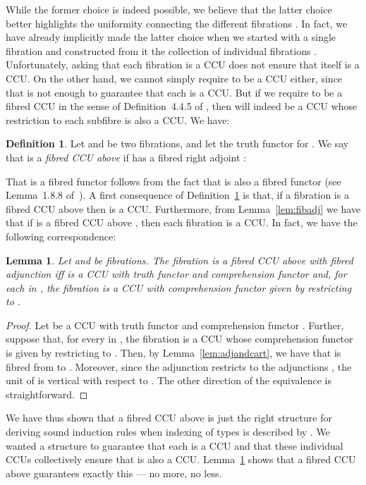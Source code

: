 \documentclass{LMCS}
\theoremstyle{plain}
\newtheorem{lemma}[theorem]{Lemma}
\theoremstyle{remark}
\theoremstyle{definition}
\newtheorem{definition}[theorem]{Definition}
\begin{document}
While the former choice is indeed possible, we believe that the latter
choice better highlights the uniformity connecting the different
fibrations . In fact, we have already implicitly made the latter
choice when we started with a single fibration  and constructed
from it the collection of individual fibrations . Unfortunately,
asking that each fibration  is a CCU does not ensure that 
itself is a CCU.
On the other hand, we cannot simply require  to be a CCU either,
since that is not enough to guarantee that each  is a CCU. But if
we require  to be a fibred CCU in the sense of Definition~4.4.5 of
\cite{jac91}, then  will indeed be a CCU whose restriction to each
subfibre  is also a CCU. We have:

\begin{definition}\label{def:ccua}
  Let  and  be two fibrations, and let
   the truth functor for . We say that  is a
  \emph{fibred CCU above } if  has a fibred right adjoint
  : 
\end{definition}
\noindent
That  is a fibred functor follows from the fact that  is also a fibred functor (see Lemma~1.8.8
of~\cite{jac99}). A first consequence of Definition~\ref{def:ccua} is
that, if a fibration  is a fibred CCU above  then  is
a CCU. Furthermore, from Lemma~\ref{lem:fibadj} we have that if 
is a fibred CCU above , then each fibration  is a CCU. In
fact, we have the following correspondence: 

\begin{lemma}\label{lem:ccuafibadj}
  Let  and  be fibrations. The fibration  is
  a fibred CCU above  with fibred adjunction  iff
   is a CCU with truth functor  and comprehension
  functor  and, for each  in , the fibration
   is a CCU with comprehension functor
   given by restricting  to .
\end{lemma}

\begin{proof}
  Let  be a CCU with truth functor  and comprehension
  functor .  Further, suppose that, for every  in
  , the fibration  is a CCU whose comprehension
  functor  is given by restricting  to
  .  Then, by Lemma~\ref{lem:adjandcart}, we have that 
  is fibred from  to . Moreover, since the adjunction
   restricts to the adjunctions ,
  the unit of  is vertical with respect to .  The
  other direction of the equivalence is straightforward.
\end{proof}

\noindent
We have thus shown that a fibred CCU  above  is just the right
structure for deriving sound induction rules when indexing of types is
described by . We wanted a structure to guarantee that each 
is a CCU and that these individual CCUs collectively ensure that 
is also a CCU. Lemma~\ref{lem:ccuafibadj} shows that a fibred CCU
above  guarantees exactly this --- no more, no less.
\end{document}
